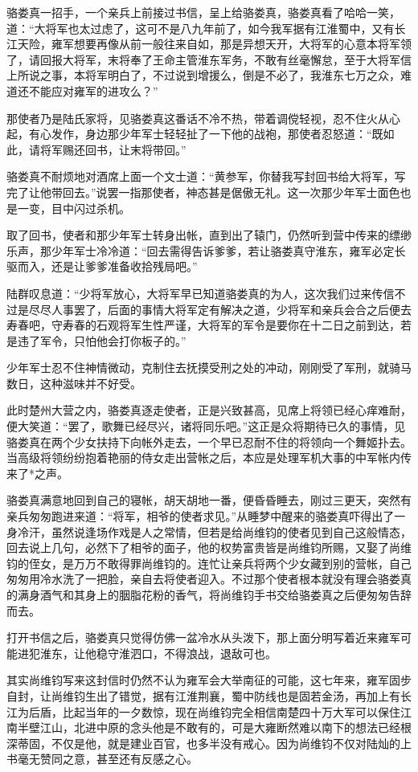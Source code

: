 骆娄真一招手，一个亲兵上前接过书信，呈上给骆娄真，骆娄真看了哈哈一笑，道：“大将军也太过虑了，这可不是八九年前了，如今我军据有江淮蜀中，又有长江天险，雍军想要再像从前一般往来自如，那是异想天开，大将军的心意本将军领了，请回报大将军，末将奉了王命主管淮东军务，不敢有丝毫懈怠，至于大将军信上所说之事，本将军明白了，不过说到增援么，倒是不必了，我淮东七万之众，难道还不能应对雍军的进攻么？”

那使者乃是陆氏家将，见骆娄真这番话不冷不热，带着调傥轻视，忍不住火从心起，有心发作，身边那少年军士轻轻扯了一下他的战袍，那使者忍怒道：“既如此，请将军赐还回书，让末将带回。”

骆娄真不耐烦地对酒席上面一个文士道：“黄参军，你替我写封回书给大将军，写完了让他带回去。”说罢一指那使者，神态甚是倨傲无礼。这一次那少年军士面色也是一变，目中闪过杀机。

取了回书，使者和那少年军士转身出帐，直到出了辕门，仍然听到营中传来的缥缈乐声，那少年军士冷冷道：“回去需得告诉爹爹，若让骆娄真守淮东，雍军必定长驱而入，还是让爹爹准备收拾残局吧。”

陆群叹息道：“少将军放心，大将军早已知道骆娄真的为人，这次我们过来传信不过是尽尽人事罢了，后面的事情大将军定有解决之道，少将军和亲兵会合之后便去寿春吧，守寿春的石观将军生性严谨，大将军的军令是要你在十二日之前到达，若是违了军令，只怕他会打你板子的。”

少年军士忍不住神情微动，克制住去抚摸受刑之处的冲动，刚刚受了军刑，就骑马数日，这种滋味并不好受。

此时楚州大营之内，骆娄真逐走使者，正是兴致甚高，见席上将领已经心痒难耐，便大笑道：“罢了，歌舞已经尽兴，诸将同乐吧。”这正是众将期待已久的事情，见骆娄真在两个少女扶持下向帐外走去，一个早已忍耐不住的将领向一个舞姬扑去。当高级将领纷纷抱着艳丽的侍女走出营帐之后，本应是处理军机大事的中军帐内传来了*之声。

骆娄真满意地回到自己的寝帐，胡天胡地一番，便昏昏睡去，刚过三更天，突然有亲兵匆匆跑进来道：“将军，相爷的使者求见。”从睡梦中醒来的骆娄真吓得出了一身冷汗，虽然说逢场作戏是人之常情，但若是给尚维钧的使者见到自己这般情态，回去说上几句，必然下了相爷的面子，他的权势富贵皆是尚维钧所赐，又娶了尚维钧的侄女，是万万不敢得罪尚维钧的。连忙让亲兵将两个少女藏到别的营帐，自己匆匆用冷水洗了一把脸，亲自去将使者迎入。不过那个使者根本就没有理会骆娄真的满身酒气和其身上的胭脂花粉的香气，将尚维钧手书交给骆娄真之后便匆匆告辞而去。

打开书信之后，骆娄真只觉得仿佛一盆冷水从头泼下，那上面分明写着近来雍军可能进犯淮东，让他稳守淮泗口，不得浪战，退敌可也。

其实尚维钧写来这封信时仍然不认为雍军会大举南征的可能，这七年来，雍军固步自封，让尚维钧生出了错觉，据有江淮荆襄，蜀中防线也是固若金汤，再加上有长江为后盾，比起当年的一夕数惊，现在尚维钧完全相信南楚四十万大军可以保住江南半壁江山，北进中原的念头他是不敢有的，可是大雍断然难以南下的想法已经根深蒂固，不仅是他，就是建业百官，也多半没有戒心。因为尚维钧不仅对陆灿的上书毫无赞同之意，甚至还有反感之心。

